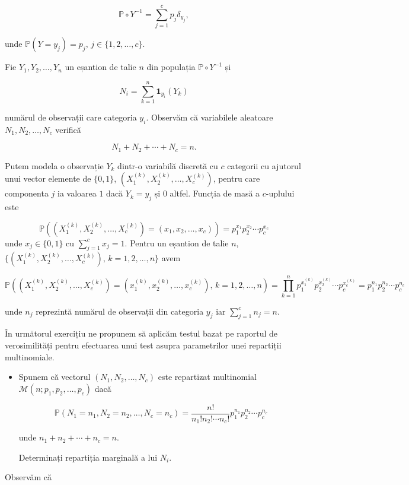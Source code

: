 \documentclass[]{article}
\newenvironment{frshaded*}{%
  \def\FrameCommand{\fboxrule=\FrameRule\fboxsep=\FrameSep \fcolorbox{framecolor}{shadecolor1}}%
  \MakeFramed {\advance\hsize-\width \FrameRestore}}%
{\endMakeFramed}
\newenvironment{rmdblock}[1]
  {\begin{frshaded*}
  \begin{itemize}
  \renewcommand{\labelitemi}{
    \raisebox{-.7\height}[0pt][0pt]{
      {\setkeys{Gin}{width=2em,keepaspectratio}\texttt{[image: images/icons/\#1]}}
    }
  }
  \item
  }
  {
  \end{itemize}
  \end{frshaded*}
  }
\newenvironment{rmdexercise}
  {\begin{rmdblock}{exercise}}
  {\end{rmdblock}}
\begin{document}
\[
\mathbb{P}\circ Y^{-1} = \sum_{j = 1}^{c}p_j\delta_{y_j},
\]

unde \(\mathbb{P}(Y = y_j) = p_{j},\, j\in\{1,2,\ldots,c\}\).

Fie \(Y_1, Y_2,\ldots, Y_n\) un eșantion de talie \(n\) din populația
\(\mathbb{P}\circ Y^{-1}\) și

\[
  N_i = \sum_{k = 1}^{n}\mathbf{1}_{y_i}(Y_k)
\]

numărul de observații care categoria \(y_i\). Observăm că variabilele
aleatoare \(N_1, N_2, \ldots, N_c\) verifică

\[
  N_1 + N_2 +\cdots+ N_c = n.
\]

Putem modela o observație \(Y_k\) dintr-o variabilă discretă cu \(c\)
categorii cu ajutorul unui vector elemente de \(\{0,1\}\),
\((X_1^{(k)}, X_2^{(k)}, \ldots, X_c^{(k)})\), pentru care componenta
\(j\) ia valoarea \(1\) dacă \(Y_k = y_j\) și \(0\) altfel. Funcția de
masă a \(c\)-uplului este

\[
\mathbb{P}((X_1^{(k)}, X_2^{(k)}, \ldots, X_c^{(k)}) = (x_1,x_2,\ldots,x_c)) = p_1^{x_1}p_2^{x_2}\cdots p_c^{x_c}
\] unde \(x_j\in\{0,1\}\) cu \(\sum_{j = 1}^{c}x_j = 1\). Pentru un
eșantion de talie \(n\),
\(\{(X_1^{(k)}, X_2^{(k)}, \ldots, X_c^{(k)}),\, k = 1,2,\ldots, n\}\)
avem

\[
\mathbb{P}\left((X_1^{(k)}, X_2^{(k)}, \ldots, X_c^{(k)}) = (x_1^{(k)},x_2^{(k)},\ldots,x_c^{(k)}), \,k = 1,2,\ldots,n\right) = \prod_{k=1}^{n}p_1^{x_1^{(k)}}p_2^{x_2^{(k)}}\cdots p_c^{x_c^{(k)}} = p_1^{n_1}p_2^{n_2}\cdots p_c^{n_c}
\]

unde \(n_j\) reprezintă numărul de observații din categoria \(y_j\) iar
\(\sum_{j = 1}^{c}n_j = n\).

În următorul exercițiu ne propunem să aplicăm testul bazat pe raportul
de verosimilități pentru efectuarea unui test asupra parametrilor unei
repartiții multinomiale.

\begin{rmdexercise}
Spunem că vectorul \((N_1, N_2,\ldots, N_c)\) este repartizat
multinomial \(\mathcal{M}(n;p_1,p_2,\ldots,p_c)\) dacă

\[
  \mathbb{P}(N_1 = n_1, N_2 = n_2, \ldots, N_c = n_c) = \frac{n!}{n_1!n_2!\cdots n_c!}p_1^{n_1}p_2^{n_2}\cdots p_c^{n_c}
\]

unde \(n_1 + n_2 +\cdots+n_c = n\).

Determinați repartiția marginală a lui \(N_i\).
\end{rmdexercise}

Observăm că
\end{document}
